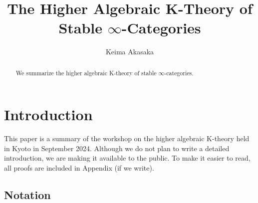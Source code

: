 \documentclass[a4paper,dvipdfmx,11pt,reqno]{amsart}
\begin{document}
\newtheorem{theorem}{Theorem}[section]
\newtheorem*{definition*}{Definition}
\newtheorem*{theorem*}{Theorem}
\newtheorem*{conjecture*}{Conjecture}

\theoremstyle{definition}
\newtheorem{definition}[theorem]{Definition}
\newtheorem{conjecture}[theorem]{Conjecture}
\newtheorem{construction}[theorem]{Construction}
\newtheorem{corollary}[theorem]{Corollary}
\newtheorem{example}[theorem]{Example}
\newtheorem{lemma}[theorem]{Lemma}
\newtheorem{notation}[theorem]{Notation}
\newtheorem{proposition}[theorem]{Proposition}
\newtheorem{question}[theorem]{Question}
\newtheorem{remark}[theorem]{Remark}

\newcommand{\additivitytheorem}{\hyperref[thrm.additivity_theorem]{additivity theorem}}
\newcommand{\universalitytheorem}{\hyperref[thrm.universality_theorem]{universality theorem}}


\title{The Higher Algebraic K-Theory of Stable \texorpdfstring{$\infty$}{infty}-Categories}
\author{Keima Akasaka}
\maketitle 

\begin{abstract}
  We summarize the higher algebraic K-theory of stable $\infty$-categories.
\end{abstract} 

\setcounter{tocdepth}{2}
\tableofcontents   

\section{Introduction}

This paper is a summary of the workshop on the higher algebraic K-theory held in Kyoto in September 2024.
Although we do not plan to write a detailed introduction, we are making it available to the public.
To make it easier to read, all proofs are included in Appendix (if we write).

\subsection{Notation}
\end{document}
